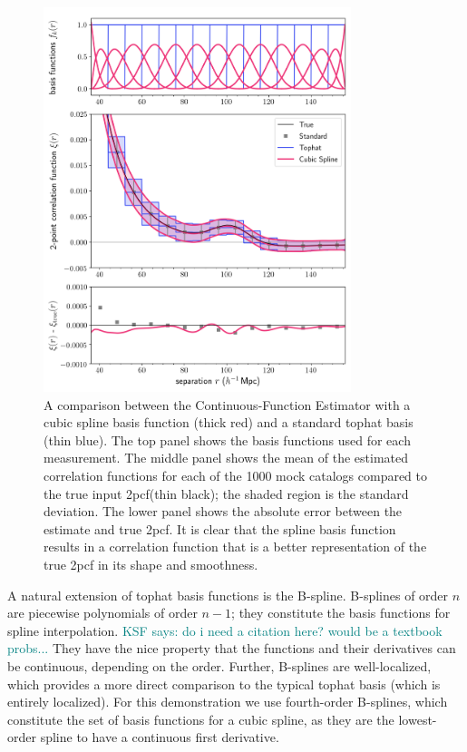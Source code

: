\documentclass[modern]{aastex62}
\newcommand{\cf}{2pcf\xspace} %
\newcommand{\est}{the Continuous-Function Estimator\xspace}
\newcommand{\KSF}[1]{\textcolor{teal}{KSF says: #1}}
\begin{document}
\begin{figure}[ht]

\centering
    \includegraphics[width=0.8\textwidth]{xicomparison_2e-4_tophat8_spline}
    \caption{A comparison between \est with a cubic spline basis function (thick red) and a standard tophat basis (thin blue). The top panel shows the basis functions used for each measurement. The middle panel shows the mean of the estimated correlation functions for each of the 1000 mock catalogs compared to the true input \cf (thin black); the shaded region is the standard deviation. The lower panel shows the absolute error between the estimate and true \cf. It is clear that the spline basis function results in a correlation function that is a better representation of the true \cf in its shape and smoothness.}
    \label{fig:spline}
\end{figure}

A natural extension of tophat basis functions is the B-spline.
B-splines of order $n$ are piecewise polynomials of order $n-1$; they constitute the basis functions for spline interpolation. \KSF{do i need a citation here? would be a textbook probs...}
They have the nice property that the functions and their derivatives can be continuous, depending on the order.
Further, B-splines are well-localized, which provides a more direct comparison to the typical tophat basis (which is entirely localized).
For this demonstration we use fourth-order B-splines, which constitute the set of basis functions for a cubic spline, as they are the lowest-order spline to have a continuous first derivative.
\end{document}
